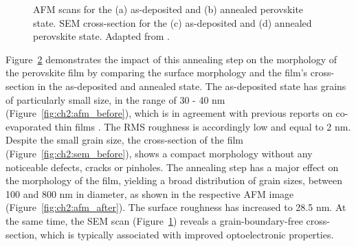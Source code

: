\begin{figure}[htbp]
\begin{subfigure}[t]{0.35\textwidth}
        \caption{}
        \label{fig:ch2:sem_after}
    \end{subfigure}
    \caption[AFM and SEM scans of the as-deposited and annealed perovskite state.]{AFM scans for the (a) as-deposited and (b) annealed perovskite state. SEM cross-section for the (c) as-deposited and (d) annealed perovskite state. Adapted from \cite{Papadopoulou2024InEllipsometry}.}
    \label{fig:ch2:afm_sem}
\end{figure}


Figure~\ref{fig:ch2:afm_sem} demonstrates the impact of this annealing step on the morphology of the perovskite film by comparing the surface morphology and the film's cross-section in the as-deposited and annealed state. The as-deposited state has grains of particularly small size, in the range of 30 - 40 nm (Figure~\ref{fig:ch2:afm_before}), which is in agreement with previous reports on co-evaporated  thin films \cite{Frolova2017HighlyPbI2, Zhang2023SemitransparentAbsorber}. The RMS roughness is accordingly low and equal to 2 nm. Despite the small grain size, the cross-section of the film (Figure~\ref{fig:ch2:sem_before}), shows a compact morphology without any noticeable defects, cracks or pinholes. The annealing step has a major effect on the morphology of the film, yielding a broad distribution of grain sizes, between 100 and 800 nm in diameter, as shown in the respective AFM image (Figure~\ref{fig:ch2:afm_after}). The surface roughness has increased to 28.5 nm. At the same time, the SEM scan (Figure~\ref{fig:ch2:sem_after}) reveals a grain-boundary-free cross-section, which is typically associated with improved optoelectronic properties. 




